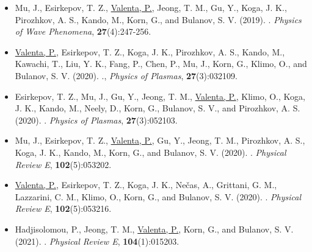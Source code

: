 \documentclass[10pt, a4paper, twoside, openright]{report}
\newcommand{\link}[3][blue]{\href{#2}{\color{#1}{#3}}}%
\begin{document}
\begin{itemize}
	
	\item Mu, J., Esirkepov, T. Z., \underline{Valenta, P.}, Jeong, T. M., Gu, Y., Koga, J. K., Pirozhkov, A. S., Kando, M., Korn, G., and Bulanov, S. V. (2019). \link{https://doi.org/10.3103/S1541308X19040010}{High-order harmonics from laser irradiated electron density singularity formed at the bow wave in the laser plasma}. \textit{Physics of Wave Phenomena}, \textbf{27}(4):247-256.
	
	\item \underline{Valenta, P.}, Esirkepov, T. Z., Koga, J. K., Pirozhkov, A. S., Kando, M., Kawachi, T., Liu, Y. K., Fang, P., Chen, P., Mu, J., Korn, G., Klimo, O., and Bulanov, S. V. (2020). \link{https://doi.org/10.1063/1.5142084}{Recoil effects on reflection from relativistic mirrors in laser plasmas}., \textit{Physics of Plasmas}, \textbf{27}(3):032109.
	
	\item Esirkepov, T. Z., Mu, J., Gu, Y., Jeong, T. M., \underline{Valenta, P.}, Klimo, O., Koga, J. K., Kando, M., Neely, D., Korn, G., Bulanov, S. V., and Pirozhkov, A. S. (2020). \link{https://doi.org/10.1063/5.0004525}{Optical probing of relativistic plasma singularities}. \textit{Physics of Plasmas}, \textbf{27}(3):052103.
	
	\item Mu, J., Esirkepov, T. Z., \underline{Valenta, P.}, Gu, Y., Jeong, T. M., Pirozhkov, A. S., Koga, J. K., Kando, M., Korn, G., and Bulanov, S. V. (2020). \link{https://doi.org/10.1103/PhysRevE.102.053202}{Relativistic flying forcibly oscillating reflective diffraction grating}. \textit{Physical Review E}, \textbf{102}(5):053202.
	
	\item \underline{Valenta, P.}, Esirkepov, T. Z., Koga, J. K., Nečas, A., Grittani, G. M., Lazzarini, C. M., Klimo, O., Korn, G., and Bulanov, S. V. (2020). \link{https://doi.org/10.1103/PhysRevE.102.053216}{Polarity reversal of wakefields driven by ultrashort pulse laser}. \textit{Physical Review E}, \textbf{102}(5):053216.
	
	\item Hadjisolomou, P., Jeong, T. M., \underline{Valenta, P.}, Korn, G., and Bulanov, S. V. (2021). \link{https://doi.org/10.1103/PhysRevE.104.015203}{Gamma-ray flash generation in irradiating a thin foil target by a single-cycle tightly focused extreme power laser pulse}. \textit{Physical Review E}, \textbf{104}(1):015203.
	

\end{itemize}
\end{document}
